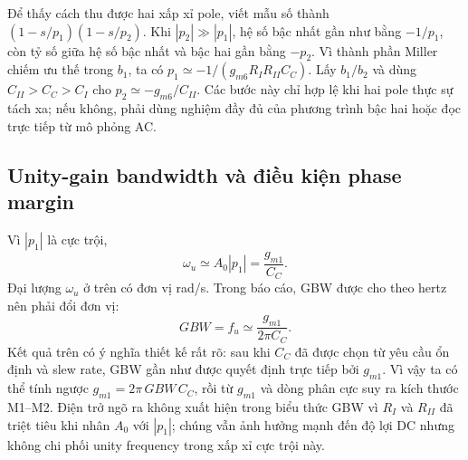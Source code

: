 \documentclass[11pt,a4paper]{report}
\begin{document}
Để thấy cách thu được hai xấp xỉ pole, viết mẫu số thành
$(1-s/p_1)(1-s/p_2)$. Khi $|p_2|\gg|p_1|$, hệ số bậc nhất gần như bằng
$-1/p_1$, còn tỷ số giữa hệ số bậc nhất và bậc hai gần bằng $-p_2$. Vì thành
phần Miller chiếm ưu thế trong $b_1$, ta có
$p_1\simeq-1/(g_{m6}R_IR_{II}C_C)$. Lấy $b_1/b_2$ và dùng
$C_{II}>C_C>C_I$ cho $p_2\simeq-g_{m6}/C_{II}$. Các bước này chỉ hợp lệ khi
hai pole thực sự tách xa; nếu không, phải dùng nghiệm đầy đủ của phương trình
bậc hai hoặc đọc trực tiếp từ mô phỏng AC.

\subsection{Unity-gain bandwidth và điều kiện phase margin}
Vì $|p_1|$ là cực trội,
\begin{equation}
\omega_u\simeq A_0|p_1|
=\frac{g_{m1}}{C_C}.
\end{equation}
Đại lượng $\omega_u$ ở trên có đơn vị rad/s. Trong báo cáo, GBW được cho theo
hertz nên phải đổi đơn vị:
\begin{equation}
\boxed{GBW=f_u\simeq\frac{g_{m1}}{2\pi C_C}}.
\end{equation}
Kết quả trên có ý nghĩa thiết kế rất rõ: sau khi $C_C$ đã được chọn từ yêu cầu
ổn định và slew rate, GBW gần như được quyết định trực tiếp bởi $g_{m1}$. Vì
vậy ta có thể tính ngược $g_{m1}=2\pi\,GBW\,C_C$, rồi từ $g_{m1}$ và dòng phân
cực suy ra kích thước M1--M2. Điện trở ngõ ra không xuất hiện trong biểu thức
GBW vì $R_I$ và $R_{II}$ đã triệt tiêu khi nhân $A_0$ với $|p_1|$; chúng vẫn
ảnh hưởng mạnh đến độ lợi DC nhưng không chi phối unity frequency trong xấp xỉ
cực trội này.
\end{document}
